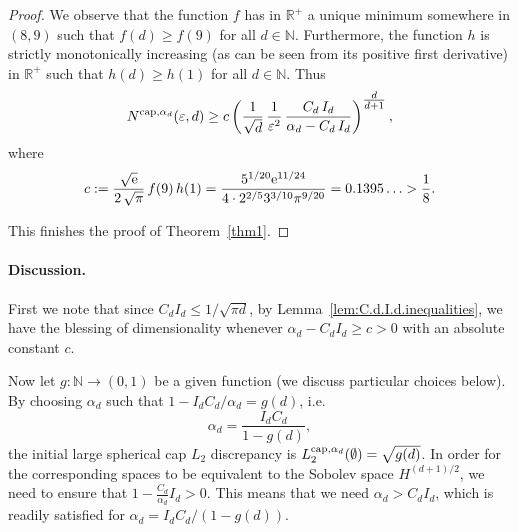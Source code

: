 \documentclass[12pt]{article}
\newcommand{\cp}{{\rm cap}}
\begin{document}
\begin{proof}
%
We observe that the function $f$ has in $\mathbb{R}^+$ a unique minimum somewhere in $(8,9)$ such that $f(d) \geq f( 9 )$ for all $d \in \mathbb{N}$. Furthermore, the function $h$ is strictly monotonically increasing (as can be seen from its positive first derivative) in $\mathbb{R}^+$ such that $h(d) \geq h(1)$ for all $d \in \mathbb{N}$. Thus 
\begin{equation*}
N^{\cp,\alpha_d}(\varepsilon, d) 
\geq 
c \left( \frac{1}{\sqrt{d}} \, \frac{1}{\varepsilon^2} \, \frac{C_d \, I_d}{\alpha_d - C_d \, I_d} \right)^{\tfrac{d}{d+1}},
\end{equation*}
where 
\begin{equation*}
c := \frac{\sqrt{{\rm e}}}{2 \, \sqrt{\pi}} \, f(9) \, h(1) 
= 
\frac{5^{1/20} {\rm e}^{11/24}}{4 \cdot 2^{2/5} 3^{3/10} \pi^{9/20}}
=
0.1395\ldots 
>
\frac{1}{8}.
\end{equation*}

%
This finishes the proof of Theorem~\ref{thm1}.
\end{proof}

\paragraph{Discussion.} First we note that since $C_d I_d \le 1/\sqrt{\pi d}$, by  Lemma~\ref{lem:C.d.I.d.inequalities}, we have the blessing of dimensionality whenever $\alpha_d - C_d I_d \ge c > 0$ with an absolute constant $c$.

 


Now let $g:\mathbb{N} \to (0, 1)$ be a given function (we discuss particular choices below). By choosing $\alpha_d$ such that $1- I_d C_d / \alpha_d = g(d)$, i.e.
\begin{equation}\label{def_alphad}
\alpha_d = \frac{I_d C_d}{1- g(d)},
\end{equation}
the initial large spherical cap $L_2$ discrepancy is $L_2^{\cp,\alpha_d}(\emptyset) = \sqrt{g(d)}$. In order for the corresponding spaces to be equivalent to the Sobolev space $H^{(d+1)/2}$, we need to ensure that $1-\frac{C_d}{\alpha_d} I_d > 0$. This means that we need $\alpha_d > C_d I_d$, which is readily satisfied for $\alpha_d = I_d C_d / (1-g(d))$.

\end{document}
